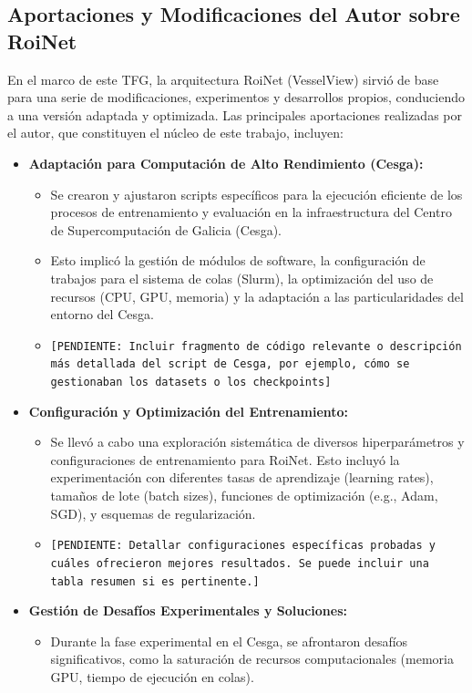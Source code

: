 \documentclass[11pt,a4paper]{report} %
\begin{document}
\subsection{Aportaciones y Modificaciones del Autor sobre RoiNet}
En el marco de este TFG, la arquitectura RoiNet (VesselView) sirvió de base para una serie de modificaciones, experimentos y desarrollos propios, conduciendo a una versión adaptada y optimizada. Las principales aportaciones realizadas por el autor, que constituyen el núcleo de este trabajo, incluyen:
\begin{itemize}
    \item \textbf{Adaptación para Computación de Alto Rendimiento (Cesga):}
        \begin{itemize}
            \item Se crearon y ajustaron scripts específicos para la ejecución eficiente de los procesos de entrenamiento y evaluación en la infraestructura del Centro de Supercomputación de Galicia (Cesga).
            \item Esto implicó la gestión de módulos de software, la configuración de trabajos para el sistema de colas (Slurm), la optimización del uso de recursos (CPU, GPU, memoria) y la adaptación a las particularidades del entorno del Cesga.
            \item \texttt{[PENDIENTE: Incluir fragmento de código relevante o descripción más detallada del script de Cesga, por ejemplo, cómo se gestionaban los datasets o los checkpoints]}
        \end{itemize}
    \item \textbf{Configuración y Optimización del Entrenamiento:}
        \begin{itemize}
            \item Se llevó a cabo una exploración sistemática de diversos hiperparámetros y configuraciones de entrenamiento para RoiNet. Esto incluyó la experimentación con diferentes tasas de aprendizaje (learning rates), tamaños de lote (batch sizes), funciones de optimización (e.g., Adam, SGD), y esquemas de regularización.
            \item \texttt{[PENDIENTE: Detallar configuraciones específicas probadas y cuáles ofrecieron mejores resultados. Se puede incluir una tabla resumen si es pertinente.]}
        \end{itemize}
    \item \textbf{Gestión de Desafíos Experimentales y Soluciones:}
        \begin{itemize}
            \item Durante la fase experimental en el Cesga, se afrontaron desafíos significativos, como la saturación de recursos computacionales (memoria GPU, tiempo de ejecución en colas).

\end{itemize}
\end{itemize}
\end{document}
